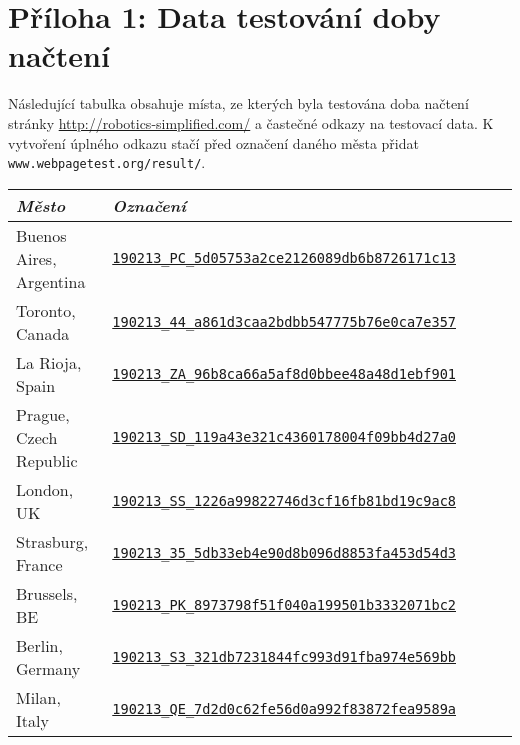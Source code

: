 \documentclass[a4paper, 12pt]{article}
\begin{document}
  \section{Příloha 1: Data testování doby načtení} \label{sec:Příloha 1: Data testování doby načtení}
  Následující tabulka obsahuje místa, ze kterých byla testována doba načtení stránky \url{http://robotics-simplified.com/} a častečné odkazy na testovací data. K vytvoření úplného odkazu stačí před označení daného města přidat \texttt{www.webpagetest.org/result/}.

\begin{table}[H]
  \centering
  \begin{tabular}{*5l}  \toprule
    \emph{Město}            & \emph{Označení}                      \\ \midrule
    Buenos Aires, Argentina & \href{https://www.webpagetest.org/result/190213_PC_5d05753a2ce2126089db6b8726171c13}{\texttt{190213\_PC\_5d05753a2ce2126089db6b8726171c13}} \\
    Toronto, Canada         & \href{https://www.webpagetest.org/result/190213_44_a861d3caa2bdbb547775b76e0ca7e357}{\texttt{190213\_44\_a861d3caa2bdbb547775b76e0ca7e357}} \\
    La Rioja, Spain         & \href{https://www.webpagetest.org/result/190213_ZA_96b8ca66a5af8d0bbee48a48d1ebf901}{\texttt{190213\_ZA\_96b8ca66a5af8d0bbee48a48d1ebf901}} \\
    Prague, Czech Republic  & \href{https://www.webpagetest.org/result/190213_SD_119a43e321c4360178004f09bb4d27a0}{\texttt{190213\_SD\_119a43e321c4360178004f09bb4d27a0}} \\
    London, UK              & \href{https://www.webpagetest.org/result/190213_SS_1226a99822746d3cf16fb81bd19c9ac8}{\texttt{190213\_SS\_1226a99822746d3cf16fb81bd19c9ac8}} \\
    Strasburg, France       & \href{https://www.webpagetest.org/result/190213_35_5db33eb4e90d8b096d8853fa453d54d3}{\texttt{190213\_35\_5db33eb4e90d8b096d8853fa453d54d3}} \\
    Brussels, BE            & \href{https://www.webpagetest.org/result/190213_PK_8973798f51f040a199501b3332071bc2}{\texttt{190213\_PK\_8973798f51f040a199501b3332071bc2}} \\
    Berlin, Germany         & \href{https://www.webpagetest.org/result/190213_S3_321db7231844fc993d91fba974e569bb}{\texttt{190213\_S3\_321db7231844fc993d91fba974e569bb}} \\
    Milan, Italy            & \href{https://www.webpagetest.org/result/190213_QE_7d2d0c62fe56d0a992f83872fea9589a}{\texttt{190213\_QE\_7d2d0c62fe56d0a992f83872fea9589a}} \\

\end{tabular}
\end{table}
\end{document}
